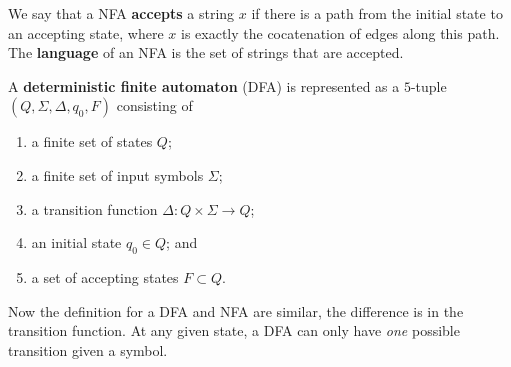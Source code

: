 We say that a NFA \textbf{accepts} a string $x$ if there is a path from
the initial state to an accepting state, where $x$ is exactly the cocatenation
of edges along this path.
The \textbf{language} of an NFA is the set of strings that are accepted.

\begin{definition}[]
    A \textbf{deterministic finite automaton} (DFA)
    is represented as a $5$-tuple
    $(Q, \Sigma, \Delta, q_0, F)$
    consisting of
    \begin{enumerate}
        \item a finite set of states $Q$;
        \item a finite set of input symbols $\Sigma$;
        \item a transition function $\Delta: Q \times \Sigma \to Q$;
        \item an initial state $q_0 \in Q$; and
        \item a set of accepting states $F \subset Q$.
    \end{enumerate}
\end{definition}

Now the definition for a DFA and NFA are similar,
the difference is in the transition function.
At any given state, a DFA can only have \emph{one}
possible transition given a symbol.

